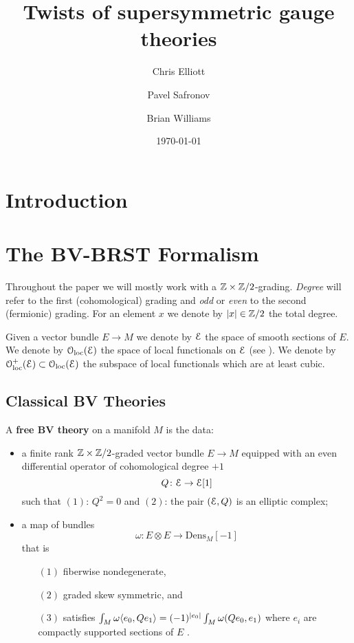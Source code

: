 \documentclass[10pt, oneside]{article}
\title{Twists of supersymmetric gauge theories}
\author{Chris Elliott\and Pavel Safronov \and Brian Williams}
\date{\today}
\newcommand{\Dens}{\mathrm{Dens}}
\begin{document}
\maketitle

\tableofcontents

\section*{Introduction}

\section{The BV-BRST Formalism}

Throughout the paper we will mostly work with a $\mathbb Z\times\mathbb Z/2$-grading. \emph{Degree} will refer to the first (cohomological) grading and \emph{odd} or \emph{even} to the second (fermionic) grading. For an element $x$ we denote by $|x|\in\mathbb Z/2$ the total degree.

Given a vector bundle $E\rightarrow M$ we denote by $\mathcal E$ the space of smooth sections of $E$. We denote by $\mathcal{O}_{\rm loc}(\mathcal E)$ the space of local functionals on $\mathcal E$ (see \cite[Definition 4.5.1.1]{Book2}). We denote by $\mathcal{O}_{\rm loc}^+(\mathcal E)\subset \mathcal{O}_{\rm loc}(\mathcal E)$ the subspace of local functionals which are at least cubic.

\subsection{Classical BV Theories}

\begin{definition}
A {\bf free BV theory} on a manifold $M$ is the data:
\begin{itemize}
\item a finite rank $\mathbb Z\times\mathbb Z/2$-graded vector bundle $E \to M$ equipped with an even differential operator of cohomological degree $+1$
\[
Q \colon \mathcal E \to \mathcal E [1] 
\]
such that $(1)$: $Q^2 = 0$ and $(2)$: the pair $(\mathcal E , Q)$ is an elliptic complex;
\item a map of bundles
\[
\omega\colon E \otimes E \to \Dens_M [-1]
\]
that is
\begin{enumerate}
\item[$(1)$] fiberwise nondegenerate,
\item[$(2)$] graded skew symmetric, and
\item[$(3)$] satisfies $\int_M \omega\langle e_0, Q e_1\rangle = (-1)^{|e_0|} \int_M \omega(Q e_0, e_1)$ where $e_i$ are compactly supported sections of $E$ .
\end{enumerate}
\end{itemize}
\end{definition}
\end{document}
